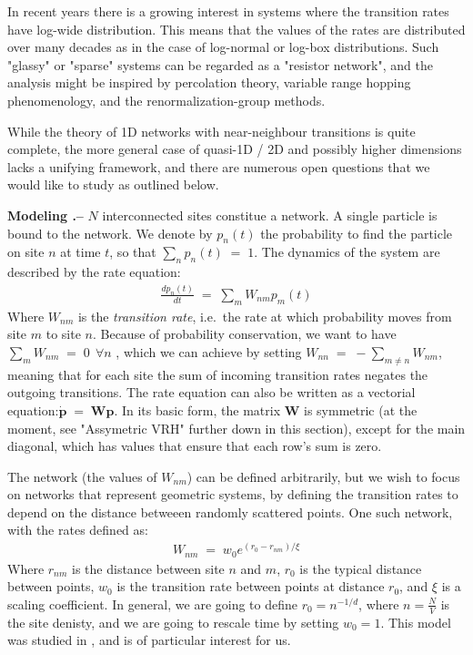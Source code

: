In recent years there is a growing interest in systems where the transition rates have log-wide distribution. This means that the values of the rates
are distributed over many decades as in the case of log-normal or log-box distributions. Such "glassy" or "sparse" systems can be regarded as a "resistor network", and the analysis might be inspired by percolation theory, variable range hopping phenomenology, and the renormalization-group methods.

While the theory of 1D networks with near-neighbour transitions is quite complete, the more general case of quasi-1D / 2D and possibly higher dimensions lacks a unifying framework, and there are numerous open questions that we would like to study as outlined below.

{ \bf Modeling .-- } $N$ interconnected sites constitue a network. A single particle is bound to the network. We denote by $p_n(t)$ the probability to find the particle on site $n$ at time $t$, so that $\sum_n p_n(t) \;=\;1$. The dynamics of the system are described by the rate equation:
\begin{align}
\frac{dp_n(t)}{dt} \;=\; \sum_m W_{nm}p_m(t)
\end{align}
Where $W_{nm}$ is the \emph{transition rate}, i.e.\ the rate at which probability moves from site $m$ to site $n$.
Because of probability conservation, we want to have $\sum_m W_{nm} \;=\; 0 \ \ \forall n$ , which we can achieve by setting $W_{nn} \;=\; -\sum_{m\ne n} W_{nm} $, meaning that for each site the sum of incoming transition rates negates the outgoing transitions.
The rate equation can also be written as a vectorial equation:$\boldsymbol{ \dot p } \;=\; \boldsymbol{W} \boldsymbol{p}$. In its basic form, the matrix $\boldsymbol{W}$ is symmetric (at the moment, see "Assymetric VRH" further down in this section), except for the main diagonal, which has values that ensure that each row's sum is zero.

The network (the values of $W_{nm}$) can be defined arbitrarily, but we wish to focus on networks that represent geometric systems, by defining the transition rates to depend on the distance betweeen randomly scattered points\cite{Mezard:1999:NPB}. One such network, with the rates defined as:
\begin{align} \label{eq:exp_rates}
  W_{nm}\;=\; w_0 e^{(r_0-r_{nm})/ \xi}
\end{align}
Where $r_{nm}$ is the distance between site $n$ and $m$, $r_0$ is the typical distance between points, $w_0$ is the transition rate between points at distance $r_0$, and $\xi$ is a scaling coefficient. In general, we are going to define $r_0 = n^{-1/d}$, where $n=\frac{N}{V}$ is the site denisty, and we are going to rescale time by setting $w_0=1$. This model was studied in \cite{Amir:2010:PRL}, and is of particular interest for us.

